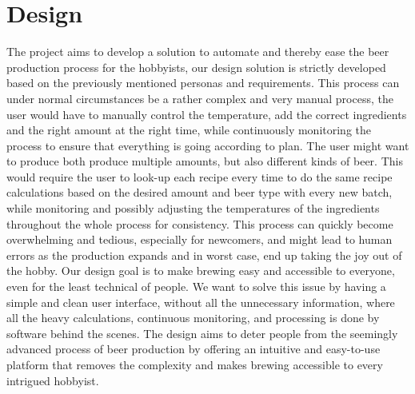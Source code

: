 \section{Design}
The project aims to develop a solution to automate and thereby ease the beer production process for the hobbyists, our design solution is strictly developed based on the previously mentioned personas and requirements.\newline
This process can under normal circumstances be a rather complex and very manual process, the user would have to manually control the temperature, add the correct ingredients and the right amount at the right time, while continuously monitoring the process to ensure that everything is going according to plan.\newline
The user might want to produce both produce multiple amounts, but also different kinds of beer. This would require the user to look-up each recipe every time to do the same recipe calculations based on the desired amount and beer type with every new batch, while monitoring and possibly adjusting the temperatures of the ingredients throughout the whole process for consistency.\newline
This process can quickly become overwhelming and tedious, especially for newcomers, and might lead to human errors as the production expands and in worst case, end up taking the joy out of the hobby.\newline
Our design goal is to make brewing easy and accessible to everyone, even for the least technical of people. We want to solve this issue by having a simple and clean user interface, without all the unnecessary information, where all the heavy calculations, continuous monitoring, and processing is done by software behind the scenes.\newline
The design aims to deter people from the seemingly advanced process of beer production by offering an intuitive and easy-to-use platform that removes the complexity and makes brewing accessible to every intrigued hobbyist.

